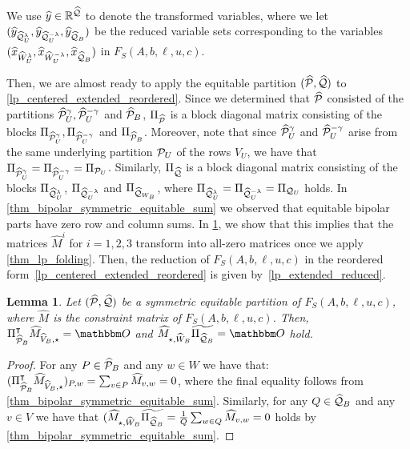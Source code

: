 \documentclass[pdflatex,sn-mathphys-num]{sn-jnl}%
\theoremstyle{thmstyleone}%
\newtheorem{lemma}[lemma]{Lemma}
\theoremstyle{thmstylethree}%
\theoremstyle{thmstyletwo}%
\begin{document}
We use $\widehat{y}\in \mathbb{R}^{\widehat{\mathcal{Q}}}$ to denote the transformed variables, where we let $(\widehat{y}_{\widehat{\mathcal{Q}}^\lambda_U}, \widehat{y}_{\widehat{\mathcal{Q}}^{-\lambda}_U}, \widehat{y}_{\widehat{\mathcal{Q}}_B})$ be the reduced variable sets corresponding to the variables $(\widehat{x}_{\widehat{W}^\lambda_U}, \widehat{x}_{\widehat{W}^{-\lambda}_U}, \widehat{x}_{\widehat{\mathcal{Q}}_B})$ in $F_S(A,b,\ell,u,c)$.

Then, we are almost ready to apply the equitable partition $(\widehat{\mathcal{P}},\widehat{\mathcal{Q}})$ to \eqref{lp_centered_extended_reordered}. Since we determined that $\widehat{\mathcal{P}}$ consisted of the partitions $\widehat{\mathcal{P}}^\gamma_U, \widehat{\mathcal{P}}^{-\gamma}_U$ and $\widehat{\mathcal{P}}_{B}$, $\Pi_{\widehat{\mathcal{P}}}$ is a block diagonal matrix consisting of the blocks $\Pi_{\widehat{\mathcal{P}}^\gamma_U}, \Pi_{\widehat{\mathcal{P}}^{-\gamma}_U}$ and $\Pi_{\widehat{\mathcal{P}}_{B}}$. Moreover, note that since $\widehat{\mathcal{P}}^{\gamma}_U$ and $ \widehat{\mathcal{P}}^{-\gamma}_U$ arise from the same underlying partition $\mathcal{P}_U$ of the rows $V_U$, we have that $\Pi_{\widehat{\mathcal{P}}^{\gamma}_U} = \Pi_{\widehat{\mathcal{P}}^{-\gamma}_U} = \Pi_{\mathcal{P}_U}$. Similarly, $\Pi_{\widehat{\mathcal{Q}}}$ is a block diagonal matrix consisting of the blocks $\Pi_{\widehat{\mathcal{Q}}^\lambda_U}$, $\Pi_{\widehat{\mathcal{Q}}^{-\lambda}_U}$ and $\Pi_{\widehat{\mathcal{Q}}_{W_B}}$, where $\Pi_{\widehat{\mathcal{Q}}^\lambda_U} = \Pi_{\widehat{\mathcal{Q}}^{-\lambda}_U} = \Pi_{\mathcal{Q}_U}$ holds. In \cref{thm_bipolar_symmetric_equitable_sum} we observed that equitable bipolar parts have zero row and column sums. In \cref{thm_zero_sums_equitable}, we show that this implies that the matrices $\widehat{M}^i$ for $i=1,2,3$ transform into all-zero matrices once we apply \cref{thm_lp_folding}. Then, the reduction of $F_S(A,b,\ell,u,c)$ in the reordered form~\eqref{lp_centered_extended_reordered} is given by~\eqref{lp_extended_reduced}.

\begin{lemma} \label{thm_zero_sums_equitable}Let $(\widehat{\mathcal{P}},\widehat{\mathcal{Q}})$ be a symmetric equitable partition of $F_S(A,b,\ell,u,c)$, where $\widehat{M}$ is the constraint matrix of $F_S(A,b,\ell,u,c)$. Then,
     $\transpose{\Pi_{\widehat{\MP}_B}}\widehat{M}_{\widehat{V}_B,\star} = \zerovec$ and $\widehat{M}_{\star, \widehat{W}_B} \widetilde{\Pi_{\widehat{\MQ}_B}} = \zerovec$ hold.
\end{lemma}
\begin{proof}
    For any $P\in \widehat{\mathcal{P}}_B$ and any $w\in W$ we have that: $(\Pi_{\widehat{\mathcal{P}}_B}^{\intercal}\widehat{M}_{\widehat{V}_B,\star})_{P,w} = \sum_{v\in P} \widehat{M}_{v,w} = 0$, where the final equality follows from \cref{thm_bipolar_symmetric_equitable_sum}. Similarly, for any $Q\in \widehat{\mathcal{Q}}_B$ and any $v\in V$ we have that $(\widehat{M}_{\star, \widehat{W}_B} \widetilde{\Pi_{\widehat{\mathcal{Q}}_B}} = \frac{1}{Q}\sum_{w\in Q} \widehat{M}_{v,w} = 0$ holds by \cref{thm_bipolar_symmetric_equitable_sum}.
\end{proof}
\end{document}
